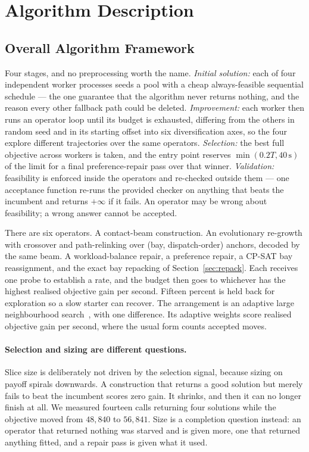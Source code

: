 \documentclass[runningheads]{llncs}
\begin{document}
\section{Algorithm Description}

\subsection{Overall Algorithm Framework}

Four stages, and no preprocessing worth the name. \emph{Initial solution:} each of four independent
worker processes seeds a pool with a cheap always-feasible sequential schedule --- the one guarantee
that the algorithm never returns nothing, and the reason every other fallback path could be
deleted. \emph{Improvement:} each worker then runs an operator loop until its budget is exhausted,
differing from the others in random seed and in its starting offset into six diversification axes,
so the four explore different trajectories over the same operators. \emph{Selection:} the best full
objective across workers is taken, and the entry point reserves $\min(0.2T, 40\,\mathrm{s})$ of the
limit for a final preference-repair pass over that winner. \emph{Validation:} feasibility is
enforced inside the operators and re-checked outside them --- one acceptance function re-runs the
provided checker on anything that beats the incumbent and returns $+\infty$ if it fails. An operator
may be wrong about feasibility; a wrong answer cannot be accepted.

There are six operators. A contact-beam construction. An evolutionary re-growth with crossover and
path-relinking over (bay, dispatch-order) anchors, decoded by the same beam. A workload-balance
repair, a preference repair, a CP-SAT bay reassignment, and the exact bay repacking of
Section~\ref{sec:repack}. Each receives one probe to establish a rate, and the budget then goes to
whichever has the highest realised objective gain per second. Fifteen percent is held back for
exploration so a slow starter can recover. The arrangement is an adaptive large neighbourhood
search~\cite{ropke2006}, with one difference. Its adaptive weights score realised objective gain
per second, where the usual form counts accepted moves.

\paragraph{Selection and sizing are different questions.}
Slice size is deliberately not driven by the selection signal, because sizing on payoff spirals
downwards. A construction that returns a good solution but merely fails to beat the incumbent
scores zero gain. It shrinks, and then it can no longer finish at all. We measured fourteen calls returning four
solutions while the objective moved from $48{,}840$ to $56{,}841$. Size is a completion question instead: an operator
that returned nothing was starved and is given more, one that returned anything fitted, and a
repair pass is given what it used.
\end{document}
